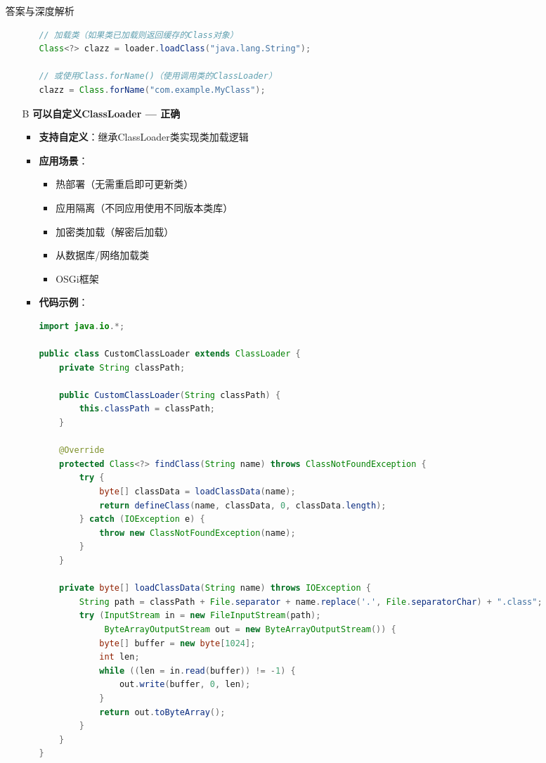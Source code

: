 \documentclass[12pt, a4paper]{ctexart}
\begin{document}
\begin{enumerate}[label=\textbf{\arabic*.}]
\begin{bluebox}{答案与深度解析}
\begin{itemize}[leftmargin=*, nosep, label={}]
\begin{itemize}[label={}, leftmargin=*, nosep]
\begin{lstlisting}[language=Java]
// 加载类（如果类已加载则返回缓存的Class对象）
Class<?> clazz = loader.loadClass("java.lang.String");

// 或使用Class.forName()（使用调用类的ClassLoader）
clazz = Class.forName("com.example.MyClass");
				      \end{lstlisting}
			            \end{itemize}

			      \item[B] \textbf{可以自定义ClassLoader — 正确}
			            \begin{itemize}[label={}, leftmargin=*, nosep]
				            \item \textbf{支持自定义}：继承ClassLoader类实现类加载逻辑
				            \item \textbf{应用场景}：
				                  \begin{itemize}[label={}, nosep]
					                  \item 热部署（无需重启即可更新类）
					                  \item 应用隔离（不同应用使用不同版本类库）
					                  \item 加密类加载（解密后加载）
					                  \item 从数据库/网络加载类
					                  \item OSGi框架
				                  \end{itemize}
				            \item \textbf{代码示例}：
				                  \begin{lstlisting}[language=Java]
import java.io.*;

public class CustomClassLoader extends ClassLoader {
    private String classPath;

    public CustomClassLoader(String classPath) {
        this.classPath = classPath;
    }

    @Override
    protected Class<?> findClass(String name) throws ClassNotFoundException {
        try {
            byte[] classData = loadClassData(name);
            return defineClass(name, classData, 0, classData.length);
        } catch (IOException e) {
            throw new ClassNotFoundException(name);
        }
    }

    private byte[] loadClassData(String name) throws IOException {
        String path = classPath + File.separator + name.replace('.', File.separatorChar) + ".class";
        try (InputStream in = new FileInputStream(path);
             ByteArrayOutputStream out = new ByteArrayOutputStream()) {
            byte[] buffer = new byte[1024];
            int len;
            while ((len = in.read(buffer)) != -1) {
                out.write(buffer, 0, len);
            }
            return out.toByteArray();
        }
    }
}


\end{lstlisting}
\end{itemize}
\end{itemize}
\end{bluebox}
\end{enumerate}
\end{document}
